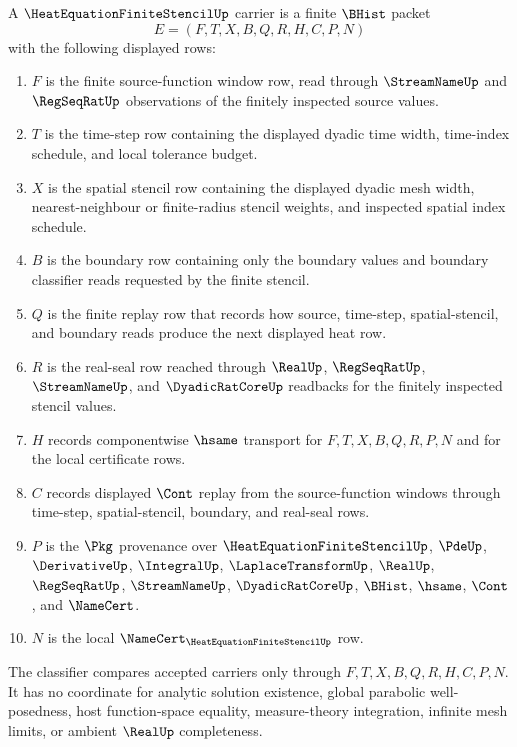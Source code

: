 \begin{definition}
\label{def:heat-equation-finite-stencil-carrier}
A $\HeatEquationFiniteStencilUp$ carrier is a finite $\BHist$ packet
$$
E=(F,T,X,B,Q,R,H,C,P,N)
$$
with the following displayed rows:
\begin{enumerate}
\item $F$ is the finite source-function window row, read through
$\StreamNameUp$ and $\RegSeqRatUp$ observations of the finitely inspected
source values.
\item $T$ is the time-step row containing the displayed dyadic time width,
time-index schedule, and local tolerance budget.
\item $X$ is the spatial stencil row containing the displayed dyadic mesh
width, nearest-neighbour or finite-radius stencil weights, and inspected
spatial index schedule.
\item $B$ is the boundary row containing only the boundary values and boundary
classifier reads requested by the finite stencil.
\item $Q$ is the finite replay row that records how source, time-step,
spatial-stencil, and boundary reads produce the next displayed heat row.
\item $R$ is the real-seal row reached through $\RealUp$, $\RegSeqRatUp$,
$\StreamNameUp$, and $\DyadicRatCoreUp$ readbacks for the finitely inspected
stencil values.
\item $H$ records componentwise $\hsame$ transport for $F,T,X,B,Q,R,P,N$ and
for the local certificate rows.
\item $C$ records displayed $\Cont$ replay from the source-function windows
through time-step, spatial-stencil, boundary, and real-seal rows.
\item $P$ is the $\Pkg$ provenance over $\HeatEquationFiniteStencilUp$,
$\PdeUp$, $\DerivativeUp$, $\IntegralUp$, $\LaplaceTransformUp$, $\RealUp$,
$\RegSeqRatUp$, $\StreamNameUp$, $\DyadicRatCoreUp$, $\BHist$, $\hsame$,
$\Cont$, and $\NameCert$.
\item $N$ is the local $\NameCert_{\HeatEquationFiniteStencilUp}$ row.
\end{enumerate}
The classifier compares accepted carriers only through
$F,T,X,B,Q,R,H,C,P,N$. It has no coordinate for analytic solution existence,
global parabolic well-posedness, host function-space equality, measure-theory
integration, infinite mesh limits, or ambient $\RealUp$ completeness.
\end{definition}

